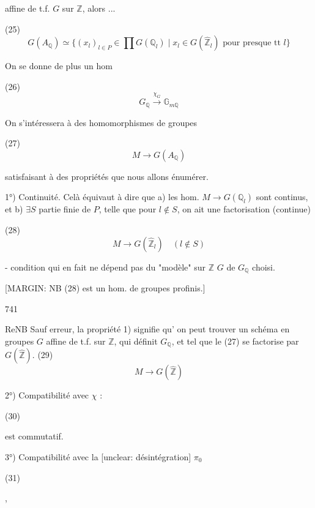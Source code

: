 affine de t.f. $G$ sur $\mathbb{Z}$, alors ...

(25) $$ G(A_{\mathbb{Q}}) \simeq \{ (x_l)_{l \in P} \in \prod G(\mathbb{Q}_l) \mid x_l \in G(\hat{\mathbb{Z}}_l) \text{ pour presque tt } l \} $$

On se donne de plus un hom

(26) $$ G_{\mathbb{Q}} \xrightarrow{\chi_G} \mathbb{G}_{m \mathbb{Q}} $$

On s'intéressera à des homomorphismes de groupes

(27) $$ M \longrightarrow G(A_{\mathbb{Q}}) $$

satisfaisant à des propriétés que nous allons énumérer.

1°) Continuité. Celà équivaut à dire que a) les hom. $M \to G(\mathbb{Q}_l)$ sont continus, et b) $\exists S$ partie finie de $P$, telle que pour $l \notin S$, on ait une factorisation (continue)

(28) $$ M \longrightarrow G(\hat{\mathbb{Z}}_l) \quad (l \notin S) $$

- condition qui en fait ne dépend pas du "modèle" sur $\mathbb{Z}$  $G$ de $G_{\mathbb{Q}}$ choisi.

[MARGIN: NB (28) est un hom. de groupes profinis.]

\newpage


741

ReNB Sauf erreur, la propriété 1) signifie qu'
on peut trouver un schéma en groupes $G$
affine de t.f. sur $\mathbb{Z}$, qui définit $G_\mathbb{Q}$, et
tel que le (27) se factorise par $G(\hat{\mathbb{Z}})$.
(29) $$M \longrightarrow G(\hat{\mathbb{Z}})$$

2°) Compatibilité avec $\chi$ :

(30)

est commutatif.

3°) Compatibilité avec la [unclear: désintégration] $\pi_0$

(31)
,

